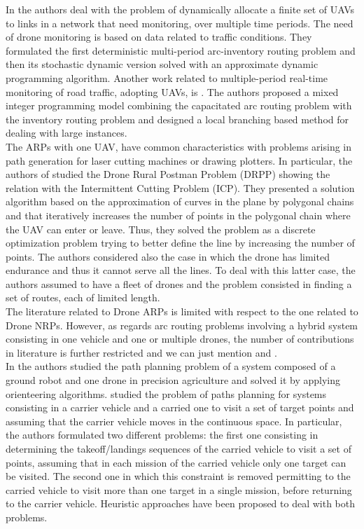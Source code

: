 In \cite{art:Chow2016} the authors deal with the problem of dynamically allocate a finite set of UAVs to links in a network that need monitoring, over multiple time periods. The need of drone monitoring is based on data related to traffic conditions. They formulated the first deterministic multi-period arc-inventory routing problem and then its stochastic dynamic version solved with an approximate dynamic programming algorithm. 
Another work related to multiple-period real-time monitoring of road traffic, adopting UAVs, is \cite{art:Li2018}. The authors proposed a mixed integer programming model combining the capacitated arc routing problem with the inventory routing problem and designed a local branching based method for dealing with large instances.\\
The ARPs with one UAV, have common characteristics with problems arising in path generation for laser cutting machines or drawing plotters. In particular, the authors of \cite{art:Campbell2018} studied the Drone Rural Postman Problem (DRPP) showing the relation with the Intermittent Cutting Problem (ICP). They presented a solution algorithm based on the approximation of curves in the plane by polygonal chains and that iteratively increases the number of points in the polygonal chain where the UAV can enter or leave. Thus, they solved the problem as a discrete optimization problem trying to better define the line by increasing the number of points. The authors considered also the case in which the drone has limited endurance and thus it cannot serve all the lines. To deal with this latter case, the authors assumed to have a fleet of drones and the problem consisted in finding a set of routes, each of limited length.\\
The literature related to Drone ARPs is limited with respect to the one related to Drone NRPs.
However, as regards arc routing problems involving a hybrid system consisting in one vehicle and one or multiple drones, the number of contributions in literature is further restricted and we can just mention \cite{art:Tokekar2016} and \cite{art:Garone2010}.\\
In \cite{art:Tokekar2016} the authors studied the path planning problem of a system composed of a ground robot and one drone in precision agriculture and solved it by applying orienteering algorithms. \cite{art:Garone2010} studied the problem of paths planning for systems consisting in a carrier vehicle and a carried one to visit a set of target points and assuming that the carrier vehicle moves in the continuous space. In particular, the authors formulated two different problems: the first one consisting in determining the takeoff/landings sequences of the carried vehicle to visit a set of points, assuming that in each mission of the carried vehicle only one target can be visited. The second one in which this constraint is removed permitting to the carried vehicle to visit more than one target in a single mission, before returning to the carrier vehicle. Heuristic approaches have been proposed to deal with both problems.\\
